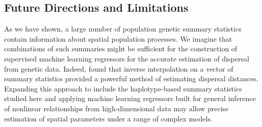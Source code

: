 \documentclass[10pt,twoside,lineno,hidelinks]{preprint}
\begin{document}
\subsection{Future Directions and Limitations}

As we have shown, a large number of population genetic summary statistics contain information about spatial population processes. We imagine that combinations of such summaries might be sufficient for the construction of supervised machine learning regressors \citep[e.g.,][]{Schrider2018} for the accurate estimation of dispersal from genetic data. Indeed, \citet{Ashander2018} found that inverse interpolation on a vector of summary statistics provided a powerful method of estimating dispersal distances. Expanding this approach to include the haplotype-based summary statistics studied here and applying machine learning regressors built for general inference of nonlinear relationships from high-dimensional data may allow precise estimation of spatial parameters under a range of complex models. 

\end{document}
